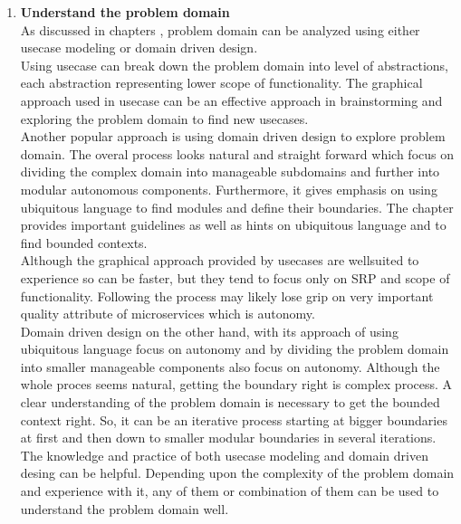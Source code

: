 \begin{enumerate}
\item \textbf{Understand the problem domain}\\
As discussed in chapters , problem domain can be analyzed using either usecase modeling or domain driven design. \\
Using usecase can break down the problem domain into level of abstractions, each abstraction representing lower scope of functionality. The graphical approach used in usecase can be an effective approach in brainstorming and exploring the problem domain to find new usecases.\\
Another popular approach is using domain driven design to explore problem domain. The overal process looks natural and straight forward which focus on dividing the complex domain into manageable subdomains and further into modular autonomous components. Furthermore, it gives emphasis on using ubiquitous language to find modules and define their boundaries. The chapter provides important guidelines as well as hints on ubiquitous language and to find bounded contexts.\\
Although the graphical approach provided by usecases are wellsuited to experience so can be faster, but they tend to focus only on \acrshort{SRP} and scope of functionality. Following the process may likely lose grip on very important quality attribute of microservices which is autonomy.\\
Domain driven design on the other hand, with its approach of using ubiquitous language focus on autonomy and by dividing the problem domain into smaller manageable components also focus on autonomy. Although the whole proces seems natural, getting the boundary right is complex process. A clear understanding of the problem domain is necessary to get the bounded context right. So, it can be an iterative process starting at bigger boundaries at first and then down to smaller modular boundaries in several iterations.\\
The knowledge and practice of both usecase modeling and domain driven desing can be helpful. Depending upon the complexity of the problem domain and experience with it, any of them or combination of them can be used to understand the problem domain well.


\end{enumerate}
